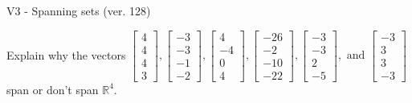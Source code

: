 \begin{exercise}
  \begin{exerciseTitle}V3 - Spanning sets (ver. 128)\end{exerciseTitle}
  \begin{exerciseStatement}
    Explain why the vectors \(\left[\begin{array}{r}
4 \\
4 \\
4 \\
3
\end{array}\right] , \left[\begin{array}{r}
-3 \\
-3 \\
-1 \\
-2
\end{array}\right] , \left[\begin{array}{r}
4 \\
-4 \\
0 \\
4
\end{array}\right] , \left[\begin{array}{r}
-26 \\
-2 \\
-10 \\
-22
\end{array}\right] , \left[\begin{array}{r}
-3 \\
-3 \\
2 \\
-5
\end{array}\right] , \text{ and } \left[\begin{array}{r}
-3 \\
3 \\
3 \\
-3
\end{array}\right]\) span or don't span \(\mathbb{R}^4\). 
	



\end{exerciseStatement}
\end{exercise}
